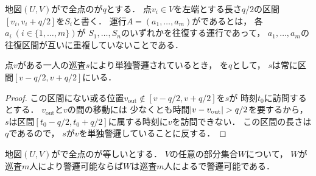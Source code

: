 \begin{defi}
  \label{defi:independentSectionOperation}
  地図$(U, V)$が{\graphLine}で全点の{\maxIdletime}が$q$とする．
  点$v_i \in V$を左端とする長さ$q/2$の区間$[v_i, v_i + q/2]$を$S_i$と書く．
  運行$A = (a_1, \ldots, a_m)$がであるとは，
  各$a_i\ (i \in \{ 1, \ldots, m \})$が
  $S_1, \ldots, S_n$のいずれかを往復する運行であって，
  $a_1, \ldots, a_m$の往復区間が互いに重複していないことである．
\end{defi}


\begin{lemm}
  \label{lemm:RangeOfPatrollerOnLine}
  点$v$がある一人の巡査$s$により単独警邏されているとき，
  {\maxIdletime}を$q$として，
  $s$は常に区間$[v - q/2, v + q/2]$にいる．
\end{lemm}
\begin{proof}
  \newcommand{\vout}{v_{\mathrm{out}}}
  この区間にない或る位置$\vout \notin [v - q/2, v + q/2]$を$s$が
  時刻$t_0$に訪問するとする．
  $\vout$と$v$の間の移動には
  少なくとも時間$\abs{v - \vout} > q / 2$を要するから，
  $s$は区間$[t_0 - q / 2, t_0 + q / 2]$に属する時刻に$v$を訪問できない．
  この区間の長さは$q$であるので，
  $s$が$v$を単独警邏していることに反する．
\end{proof}


\begin{lemm}
  \label{lemm:LineUnaryIdletimeIndependentInterval}
  地図$(U, V)$が{\graphLine}で全点の{\maxIdletime}が等しいとする．
  $V$の任意の部分集合$W$について，
  $W$が巡査$m$人により警邏可能ならば$W$は巡査$m$人による{\indSectOperation}で警邏可能である．
\end{lemm}

